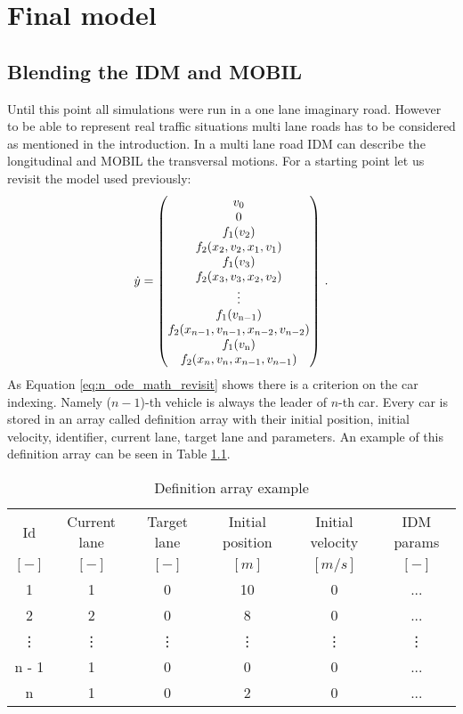 \chapter{Final model}
	\section{Blending the IDM and MOBIL}
		Until this point all simulations were run in a one lane imaginary road. However to be able to represent real traffic situations multi lane roads has to be considered as mentioned in the introduction. In a multi lane road IDM can describe the longitudinal and MOBIL the transversal motions. For a starting point let us revisit the model used previously:
		\begin{equation}
			\dot{y}=
			\begin{pmatrix}
			v_0\\
			0\\
			f_1(v_{2})\\
			f_2(x_{2}, v_{2},x_{1}, v_{1})\\
			f_1(v_{3})\\
			f_2(x_{3}, v_{3},x_{2}, v_{2})\\
			\vdots\\
			f_1(v_{\rm n-1})\\
			f_2(x_{n-1}, v_{n-1},x_{n-2}, v_{n-2})\\
			f_1(v_{\rm n})\\
			f_2(x_{n}, v_{n},x_{n-1}, v_{n-1})
			\end{pmatrix}\,.
			\label{eq:n_ode_math_revisit}
		\end{equation}
		As Equation \ref{eq:n_ode_math_revisit} shows there is a criterion on the car indexing.  Namely ($n-1$)-th vehicle is always the leader of $n$-th car. Every car is stored in an array called definition array with their initial position, initial velocity, identifier, current lane, target lane and parameters. An example of this definition array can be seen in Table \ref{tab:definition_array}.
		\begin{table}
			\begin{center}
				\begin{tabular}{ |c|c|c|c|c|c| }
					\hline
					Id & Current lane & Target lane & Initial position & Initial velocity& IDM params\\
					$[-]$ & $[-]$ & $[-]$ & $[m]$ & $[m/s]$ & $[-]$\\
					\hline
					1 & 1 & 0 & 10 & 0 & ...\\
					2 & 2 & 0 & 8 & 0 & ...\\
					\vdots & \vdots & \vdots & \vdots & \vdots & \vdots\\
					n - 1 & 1 & 0 & 0 & 0 & ...\\
					n & 1 & 0 & 2 & 0 & ...\\
					\hline
				\end{tabular}
			\end{center}
			\caption{Definition array example}
			\label{tab:definition_array}
		\end{table}
